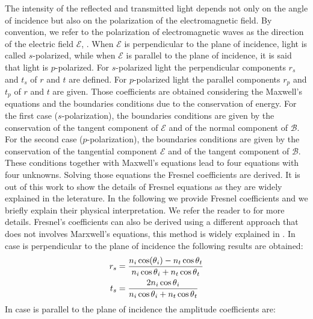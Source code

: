 The intensity of the reflected and transmitted light depends not only on the angle of incidence but also on the polarization of the electromagnetic field.
By convention, we refer to the polarization of electromagnetic waves as the direction of the electric field $\boldsymbol{\mathcal{E}}$, 
\cite{feynman1964feynman}. When $\boldsymbol{\mathcal{E}}$ is perpendicular to the plane of incidence, light is called $s$-polarized, while when
$\boldsymbol{\mathcal{E}}$ is parallel to the plane of incidence, it is said that light is $p$-polarized.
For $s$-polarized light the perpendicular components $r_s$ and $t_s$ of $r$ and $t$ are defined. 
For $p$-polarized light the parallel components $r_p$ and $t_p$ of $r$ and $t$ are given. 
Those coefficients are obtained considering the Maxwell's equations and the boundaries conditions due to the conservation of energy.
For the first case ($s$-polarization), the boundaries conditions are given by the conservation of the tangent component of $\boldsymbol{\mathcal{E}}$ and of the normal component of $\boldsymbol{\mathcal{B}}$. For the second case ($p$-polarization), the boundaries conditions are given by the conservation of the tangential component $\boldsymbol{\mathcal{E}}$ and of the tangent component of $\boldsymbol{\mathcal{B}}$. These conditions together with Maxwell's equations lead to four equations with four unknowns.
Solving those equations the Fresnel coefficients are derived. 
It is out of this work to show the details of Fresnel equations as they are widely explained in the leterature. 
In the following we provide Fresnel coefficients and we briefly explain their physical interpretation. We refer the reader to \cite{born2013principles, hecht1998hecht} for more details. 
Fresnel's coefficients can also be derived using a different approach that does not involves Marxwell's equations, this method is widely explained in \cite{feynman2011feynman}. 
In case  is perpendicular to the plane of incidence the following results are obtained:
\begin{equation} \label{Fresnel_perpendicular}
\begin{split}
r_{s} & = \frac{n_i\cos(\mbox{$\theta$}_i)-n_t \cos\mbox{$\theta$}_t}{n_i \cos\mbox{$\theta$}_i+n_t\cos\mbox{$\theta$}_t}\\
t_{s} & =  \frac{2n_i\cos\mbox{$\theta$}_i}{n_i\cos\mbox{$\theta$}_i+n_t\cos\mbox{$\theta$}_t}
\end{split}
\end{equation}
In case  is parallel to the plane of incidence the amplitude coefficients are:
